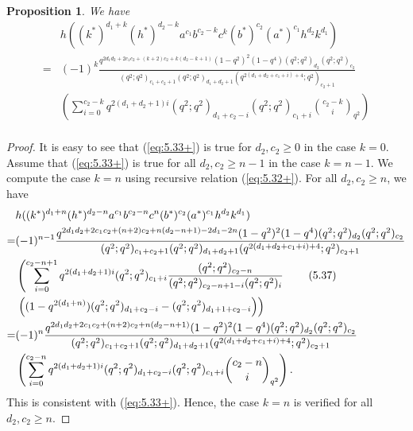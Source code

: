 \documentclass[table,a4paper,reqno]{amsart}
\numberwithin{equation}{section}
\newtheorem{proposition}[theorem]{Proposition}
\theoremstyle{definition}
\begin{document}
\begin{proposition} We have
    \begin{equation}\label{eq:5.33+}
        \begin{split}
            &h((k^*)^{d_1+k}(h^*)^{d_2-k}a^{c_1}b^{c_2-k}c^{k}(b^*)^{c_2}(a^*)^{c_1}h^{d_2}k^{d_1})\\
            =&(-1)^k\frac{q^{2d_1d_2+2c_1c_2+(k+2)c_2+k(d_2-k+1)}(1-q^2)^2(1-q^4)(q^2;q^2)_{d_2}(q^2;q^2)_{c_2}}{(q^2;q^2)_{c_1+c_2+1}(q^2;q^2)_{d_1+d_2+1}(q^{2(d_1+d_2+c_1+i)+4};q^2)_{c_2+1}}\\
            &\left(\sum_{i=0}^{c_2-k}q^{2(d_1+d_2+1)i}(q^2;q^2)_{d_1+c_2-i}(q^2;q^2)_{c_1+i}{c_2-k\choose i}_{q^2}\right)\\
        \end{split}
    \end{equation}
\end{proposition}
\begin{proof}
    It is easy to see that (\ref{eq:5.33+}) is true for $d_2,c_2\ge 0$ in the case $k=0$. Assume that (\ref{eq:5.33+}) is true for all $d_2,c_2\ge n-1$ in the case $k=n-1$. We compute the case $k=n$ using recursive relation (\ref{eq:5.32+}). For all $d_2,c_2\ge n$, we have
    \begin{align}\label{eq:5.36+}\stepcounter{equation}
            &h((k^*)^{d_1+n}(h^*)^{d_2-n}a^{c_1}b^{c_2-n}c^{n}(b^*)^{c_2}(a^*)^{c_1}h^{d_2}k^{d_1})\notag\\
            =&(-1)^{n-1}\frac{q^{2d_1d_2+2c_1c_2+(n+2)c_2+n(d_2-n+1)-2d_1-2n}(1-q^2)^2(1-q^4)(q^2;q^2)_{d_2}(q^2;q^2)_{c_2}}{(q^2;q^2)_{c_1+c_2+1}(q^2;q^2)_{d_1+d_2+1}(q^{2(d_1+d_2+c_1+i)+4};q^2)_{c_2+1}}\notag\\
            &\left(\sum_{i=0}^{c_2-n+1}q^{2(d_1+d_2+1)i}(q^2;q^2)_{c_1+i}\frac{(q^2;q^2)_{c_2-n}}{(q^2;q^2)_{c_2-n+1-i}(q^2;q^2)_{i}}\right.\tag{5.37}\\
            &\left.\left((1-q^{2(d_1+n)})(q^2;q^2)_{d_1+c_2-i}-(q^2;q^2)_{d_1+1+c_2-i}\right)\right)\notag\\
            =&(-1)^n\frac{q^{2d_1d_2+2c_1c_2+(n+2)c_2+n(d_2-n+1)}(1-q^2)^2(1-q^4)(q^2;q^2)_{d_2}(q^2;q^2)_{c_2}}{(q^2;q^2)_{c_1+c_2+1}(q^2;q^2)_{d_1+d_2+1}(q^{2(d_1+d_2+c_1+i)+4};q^2)_{c_2+1}}\notag\\
            &\left(\sum_{i=0}^{c_2-n}q^{2(d_1+d_2+1)i}(q^2;q^2)_{d_1+c_2-i}(q^2;q^2)_{c_1+i}{c_2-n\choose i}_{q^2}\right).\notag
    \end{align}
    This is consistent with (\ref{eq:5.33+}). Hence, the case $k=n$ is verified for all $d_2,c_2\ge n$.
\end{proof}
\end{document}
